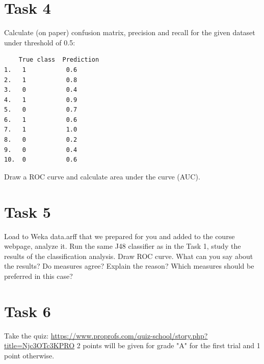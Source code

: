 \documentclass{article}
\begin{document}
\section*{Task 4}
Calculate (on paper) confusion matrix, precision and recall for the given dataset under threshold of 0.5:
\begin{verbatim}
    True class  Prediction
1.   1           0.6
2.   1           0.8
3.   0           0.4	
4.   1           0.9
5.   0           0.7
6.   1           0.6
7.   1           1.0
8.   0           0.2
9.   0           0.4
10.  0           0.6
\end{verbatim}

Draw a ROC curve and calculate area under the curve (AUC).

\section*{Task 5}
Load to Weka data.arff that we prepared for you and added to the course webpage, analyze it. Run the same J48 classifier as in the Task 1, study the results of the classification analysis. Draw ROC curve. What can you say about the results? Do measures agree? Explain the reason? Which measures should be preferred in this case?

\section*{Task 6}
Take the quiz: \url{https://www.proprofs.com/quiz-school/story.php?title=Njc3OTc3KPRO}
2 points will be given for grade "A" for the first trial and 1 point otherwise. 
\end{document}
